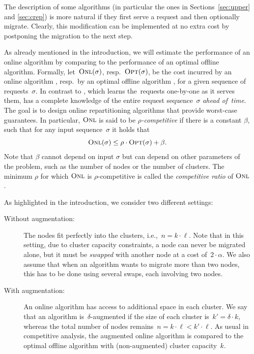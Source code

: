 The description of some algorithms (in particular the ones in Sections~\ref{sec:upper}
and \ref{sec:crep}) is more natural if they first serve a request and then
optionally migrate. Clearly, this modification can be implemented at no extra cost by
postponing the migration to the next step.

As already mentioned in the introduction, we will estimate
the performance of an online algorithm by comparing to the performance of an optimal offline
algorithm. Formally, let~$\textsc{Onl}(\sigma)$, resp.~$\textsc{Opt}(\sigma)$, be the cost
incurred by an online algorithm \ONL, resp.~by an optimal offline
algorithm \OPT, for a given sequence of requests~$\sigma$. In contrast to \ONL, which learns the~requests one-by-one as
it serves them, \OPT has a complete knowledge of the entire request
sequence~$\sigma$ \emph{ahead of~time}. The goal is to design online repartitioning
algorithms that provide worst-case guarantees. In particular, $\textsc{Onl}$ is said
to be \emph{$\rho$-competitive} if there is a constant $\beta$, such that for any
input sequence~$\sigma$ it holds that
\[
	\textsc{Onl}(\sigma) \leq \rho \cdot \textsc{Opt}(\sigma) + \beta.
\]
Note that $\beta$ cannot depend on input $\sigma$ but can depend on other
parameters of the problem, such as the number of nodes or the number of clusters.
The minimum $\rho$ for which $\textsc{Onl}$ is $\rho$-competitive is called the 
\emph{competitive ratio} of $\textsc{Onl}$. 

As highlighted in the introduction, we consider two different settings:

\begin{description}

\item[Without augmentation:] The nodes fit perfectly into the clusters,
i.e.,~$n=k\cdot \ell$. Note that in this setting, due to cluster capacity
constraints, a node can never be migrated alone, but it must be \emph{swapped}
with another node at a cost of~$2 \cdot \alpha$. We also assume that when an
algorithm wants to migrate more than two nodes, this has to be done using
several swaps, each involving two nodes.

\item[With augmentation:] An online algorithm has access to additional space
in each cluster. We say that an algorithm is~$\delta$-augmented if the size of
each cluster is~$k' = \delta \cdot k$, whereas the total number of nodes
remains~$n = k\cdot \ell < k'\cdot \ell$. As usual in competitive analysis,
the augmented online algorithm is compared to the optimal offline algorithm
with (non-augmented) cluster capacity~$k$.
\end{description}

